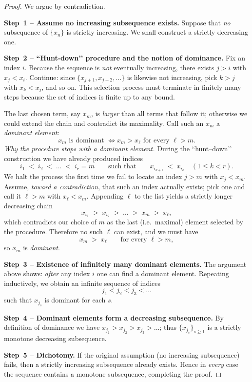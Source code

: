 \documentclass[12pt]{article}
\theoremstyle{definition} %
\theoremstyle{plain} %
\begin{document}
\begin{proof}
  We argue by contradiction.

  \smallskip
  \textbf{Step 1 – Assume no increasing subsequence exists.}
  Suppose that \emph{no} subsequence of $\{x_n\}$ is strictly increasing.  
  We shall construct a strictly decreasing one.

  \smallskip
  \textbf{Step 2 – ``Hunt‐down’’ procedure and the notion of dominance.}
  Fix an index $i$.  
  Because the sequence is \emph{not} eventually increasing, there exists
  $j>i$ with $x_j<x_i$.  
  Continue: since $\{x_{j+1},x_{j+2},\dots\}$ is likewise not increasing,
  pick $k>j$ with $x_k<x_j$, and so on.
  This selection process must terminate in finitely many steps because the
  set of indices is finite up to any bound.

  The last chosen term, say $x_m$, is \emph{larger} than all terms that
  follow it; otherwise we could extend the chain and contradict its
  maximality.  Call such an $x_m$ a \emph{dominant element}:
  \[
      x_m\text{ is dominant } \iff 
      x_m>x_\ell\text{ for every }\ell>m.
  \]
\medskip\noindent
\emph{Why the procedure stops with a dominant element.}
During the ``hunt–down’’ construction we have already produced indices
\[
      i_{1}\;<\;i_{2}\;<\;\dots\;<\;i_{r}=m
      \qquad\text{such that}\qquad
      x_{i_{k+1}} \;<\; x_{i_{k}}
      \quad(1\le k<r).
\]
We halt the process the first time we fail to locate an index
\(j>m\) with \(x_{j}<x_{m}\).
Assume, \emph{toward a contradiction}, that such an index actually exists;
pick one and call it \(\ell\!>\!m\) with \(x_{\ell}<x_{m}\).
Appending \(\ell\) to the list yields a strictly longer decreasing chain
\[
      x_{i_{1}}
      \;>\;
      x_{i_{2}}
      \;>\;\dots\;>\;
      x_{m}
      \;>\;
      x_{\ell},
\]
which contradicts our choice of \(m\) as the last (i.e.\ maximal) element
selected by the procedure.
Therefore no such \(\ell\) can exist, and we must have
\[
      x_{m} \;>\; x_{\ell} 
      \qquad\text{for every } \ell>m,
\]
so \(x_{m}\) is \emph{dominant}.
\medskip

  \smallskip
  \textbf{Step 3 – Existence of infinitely many dominant elements.}
  The argument above shows:  
  \emph{after} any index $i$ one can find a dominant element.  
  Repeating inductively, we obtain an infinite sequence of indices
  \[
      j_1<j_2<j_3<\dots
  \]
  such that $x_{j_s}$ is dominant for each $s$.

  \smallskip
  \textbf{Step 4 – Dominant elements form a decreasing subsequence.}
  By definition of dominance we have
  \(
      x_{j_1}>x_{j_2}>x_{j_3}>\dots
  \);
  thus $\{x_{j_s}\}_{s\ge1}$ is a strictly monotone decreasing
  subsequence.

  \smallskip
  \textbf{Step 5 – Dichotomy.}
  If the original assumption (no increasing subsequence) fails, then a
  strictly increasing subsequence already exists.
  Hence in \emph{every} case the sequence contains a monotone subsequence,
  completing the proof.
\end{proof}
\end{document}
